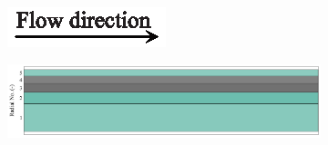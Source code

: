 \documentclass[preprint,12pt]{elsarticle}
\begin{document}
\begin{figure}[h!]
     \centering
     \begin{subfigure}[b]{\textwidth}
     	\includegraphics[width=\textwidth]{flow_dir.eps}
     \end{subfigure}
     \begin{subfigure}[b]{0.85\textwidth}
\includegraphics[width=\textwidth]{results/segments/5segEq/60C40T/seg.png}
     \end{subfigure}
     \hfill
     \begin{subfigure}[b]{0.1\textwidth}

\end{subfigure}
\end{figure}
\end{document}
